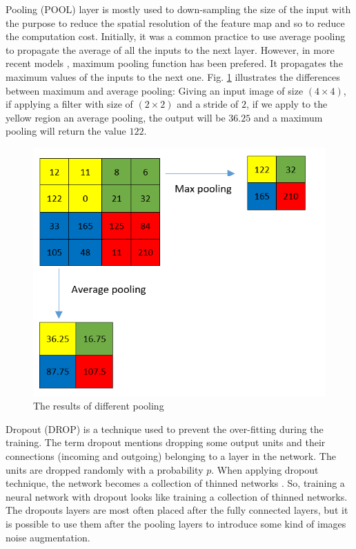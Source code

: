 \documentclass[review]{elsarticle}
\begin{document}
Pooling (POOL) layer is mostly used to down-sampling the size of the input with the purpose to reduce the spatial resolution of the feature map and so to reduce the computation cost. Initially, it was a common practice to use average pooling to propagate the average of all the inputs to the next layer. However, in more recent models \cite{krizhevsky2012imagenet, ciregan2012multi, li2015convolutional}, maximum pooling function has been prefered. It propagates the maximum values of the inputs to the next one. Fig. \ref{imgcnn_pooling} illustrates the differences between maximum and average pooling: Giving an input image of size $(4 \times 4)$, if applying a filter with size of $(2 \times 2)$ and a stride of $2$, if we apply to the yellow region an average pooling, the output will be $36.25$ and a maximum pooling will return the value $122$.

\begin{figure}[!h]
	\centering
	\includegraphics[scale=.5]{images/pooling}
	\caption{The results of different pooling}
	\label{imgcnn_pooling}
\end{figure}

Dropout (DROP) \cite{srivastava2014dropout} is a technique used to prevent the over-fitting during the training. The term dropout mentions dropping some output units and their connections (incoming and outgoing) belonging to a layer in the network. The units are dropped randomly with a probability $p$. When applying dropout technique, the network becomes a collection of thinned networks \cite{srivastava2014dropout}. So, training a neural network with dropout looks like training a collection of thinned networks. The dropouts layers are most often placed after the fully connected layers, but it is possible to use them after the pooling layers to introduce some kind of images noise augmentation.
\end{document}

